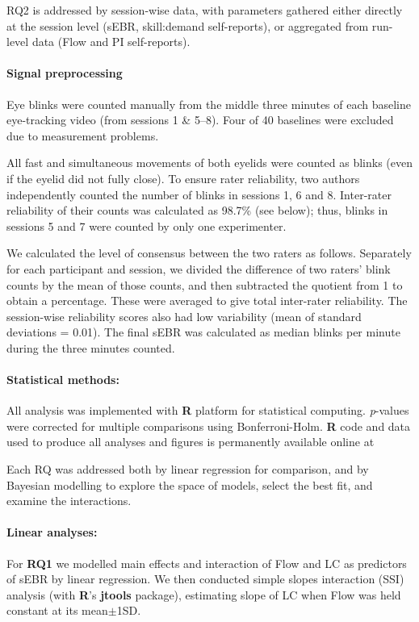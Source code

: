 \documentclass[10pt,letterpaper,floatsintext]{article}
\begin{document}
RQ2 is addressed by session-wise data, with parameters gathered either directly at the session level (sEBR, skill:demand self-reports), or aggregated from run-level data (Flow and PI self-reports).

\paragraph{Signal preprocessing}
Eye blinks were counted manually from the middle three minutes of each baseline eye-tracking video (from sessions 1 \& 5--8). Four of 40 baselines were excluded due to measurement problems.

All fast and simultaneous movements of both eyelids were counted as blinks (even if the eyelid did not fully close). To ensure rater reliability, two authors independently counted the number of blinks in sessions 1, 6 and 8. Inter-rater reliability of their counts was calculated as 98.7\% (see below); thus, blinks in sessions 5 and 7 were counted by only one experimenter.

We calculated the level of consensus between the two raters as follows. Separately for each participant and session, we divided the difference of two raters' blink counts by the mean of those counts, and then subtracted the quotient from 1 to obtain a percentage. These were averaged to give total inter-rater reliability. The session-wise reliability scores also had low variability (mean of standard deviations = 0.01). The final sEBR was calculated as median blinks per minute during the three minutes counted.

\paragraph{Statistical methods:}
All analysis was implemented with {\bf R} platform for statistical computing. {\it p}-values were corrected for multiple comparisons using Bonferroni-Holm. {\bf R} code and data used to produce all analyses and figures is permanently available online at 

Each RQ was addressed both by linear regression for comparison, and by Bayesian modelling to explore the space of models, select the best fit, and examine the interactions. 

\paragraph{Linear analyses:}
For {\bf RQ1} we modelled main effects and interaction of Flow and LC as predictors of sEBR by linear regression. We then conducted simple slopes interaction (SSI) analysis (with {\bf R}'s {\bf jtools} package), estimating slope of LC when Flow was held constant at its mean$\pm$1SD. 
\end{document}
